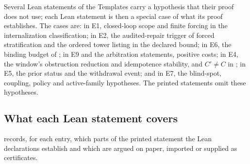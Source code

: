Several Lean statements of the Templates carry a
hypothesis that their proof does not use; each Lean statement is then a special case of what its
proof establishes. The cases are: in E1, closed-loop scope and finite forcing in the internalization
classification; in E2, the audited-repair trigger of forced stratification and the ordered tower
listing in the declared bound; in E6, the binding budget of ; in E9 and the
arbitration statements, positive costs; in E4, the window's obstruction reduction and idempotence
stability, and $C' \ne C$ in ; in E5, the prior status and the withdrawal event;
and in E7, the blind-spot, coupling, policy and active-family hypotheses. The printed statements omit
these hypotheses.

\subsection{What each Lean statement covers}

 records, for each entry, which parts of the printed statement the Lean
declarations establish and which are argued on paper, imported or supplied as certificates.

